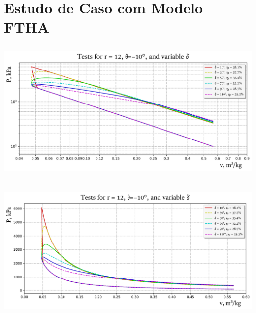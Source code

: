 \section{Estudo de Caso com Modelo FTHA}

    \begin{frame}{}\vspace*{-2em}
        \begin{center}
            \includegraphics[height=70.0mm]{fig/test_r=12,0_speed.pdf}
        \end{center}
    \end{frame}

    \begin{frame}{}\vspace*{-2em}
        \begin{center}
            \includegraphics[height=70.0mm]{fig/test_r=12,0_speed-P.pdf}
        \end{center}
    \end{frame}

